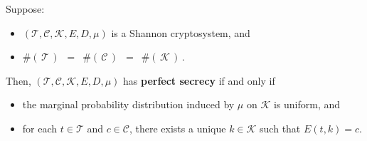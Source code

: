 \begin{theorem}[Shannon]
\mbox{}
\vskip 0.1cm
\noindent
Suppose:
\begin{itemize}
\item
	$(\mathcal{T},\mathcal{C},\mathcal{K},E,D,\mu)$
	is a Shannon cryptosystem, and
\item
	$\#\!\left(\,\mathcal{T}\,\right)$
	\,$=$\,
	$\#\!\left(\,\mathcal{C}\,\right)$
	\,$=$\,
	$\#\!\left(\,\mathcal{K}\,\right)$\,.
\end{itemize}
Then, $(\mathcal{T},\mathcal{C},\mathcal{K},E,D,\mu)$
has \textbf{perfect secrecy} if and only if
\begin{itemize}
\item
	the marginal probability distribution induced by $\mu$ on $\mathcal{K}$ is uniform, and
\item
	for each $t \in \mathcal{T}$ and $c \in \mathcal{C}$,
	there exists a unique $k \in \mathcal{K}$
	such that $E(t,k) = c$.
\end{itemize}
\end{theorem}

